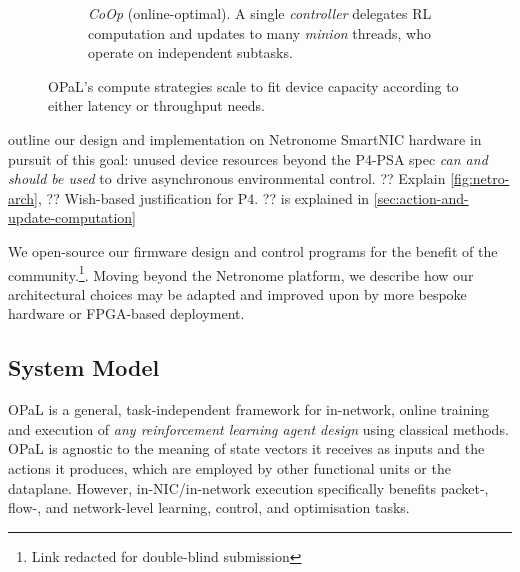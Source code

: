 \documentclass[sigconf,natbib=false]{acmart}
\newcommand{\approachshort}{OPaL}
\newcommand{\Coopfw}{\emph{CoOp}}
\begin{document}
\begin{figure}
\begin{subfigure}{0.45\linewidth}
		\caption{\Coopfw{} (online-optimal). A single \emph{controller} delegates RL computation and updates to many \emph{minion} threads, who operate on independent subtasks.\label{fig:single-and-parallel:parallel}}
	\end{subfigure}
	\caption{\approachshort{}'s compute strategies scale to fit device capacity according to either latency or throughput needs.\label{fig:single-and-parallel}}
\end{figure}

 outline our design and implementation on Netronome SmartNIC hardware in pursuit of this goal: unused device resources beyond the P4-PSA spec \emph{can and should be used} to drive asynchronous environmental control.
?? Explain \cref{fig:netro-arch},
?? Wish-based justification for P4.
??  is explained in \cref{sec:action-and-update-computation}

We open-source our firmware design and control programs for the benefit of the community.\footnote{Link redacted for double-blind submission}.
Moving beyond the Netronome platform, we describe how our architectural choices may be adapted and improved upon by more bespoke hardware or FPGA-based deployment.

\subsection{System Model}
\approachshort{} is a general, task-independent framework for in-network, online training and execution of \emph{any reinforcement learning agent design} using classical methods.
\approachshort{} is agnostic to the meaning of state vectors it receives as inputs and the actions it produces, which are employed by other functional units or the dataplane.
However, in-NIC/in-network execution specifically benefits packet-, flow-, and network-level learning, control, and optimisation tasks.
\end{document}
